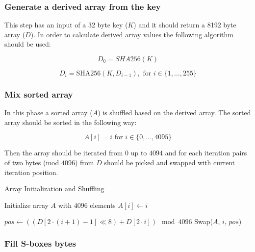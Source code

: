 \documentclass{article} %
\begin{document}
\subsubsection{Generate a derived array from the key}
This step has an input of a 32 byte key ($K$) and it should return a 8192 byte array ($D$).
In order to calculate derived array values the following algorithm should be used:

\begin{equation}
  D_0 = SHA256(K)
\end{equation}

\begin{equation}
  D_i = \text{SHA256}(K, D_{i-1}), \text{ for } i \in \{1, \ldots, 255\}
\end{equation}

\subsubsection{Mix sorted array}
In this phase a sorted array ($A$) is shuffled based on the derived array.
The sorted array should be sorted in the following way:

\begin{equation}
  A[i] = i \text{ for } i \in \{0, \ldots, 4095\}
\end{equation}

Then the array should be iterated from $0$ up to $4094$ and for each iteration pairs of two bytes (mod $4096$) from $D$ should be picked and swapped with current iteration position.

\begin{algorithm}[H]
  \caption{Array Initialization and Shuffling}
  \begin{algorithmic}[1]
  \State Initialize array $A$ with $4096$ elements
      \State $A[i] \gets i$
  \EndFor
  
      \State $pos \gets ((D[2 \cdot (i+1) - 1] \ll 8) + D[2 \cdot i]) \mod 4096$
      \State Swap($A$, $i$, $pos$)
  \EndFor
  \end{algorithmic}
\end{algorithm}


\subsubsection{Fill S-boxes bytes}
\end{document}
